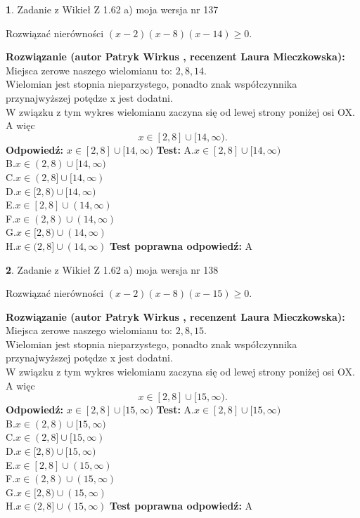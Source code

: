 \documentclass[12pt, a4paper]{article}
\theoremstyle{definition} %
\newtheorem{zad}{}
\newcommand{\zadStart}[1]{\begin{zad}#1\newline}
\newcommand{\zadStop}{\end{zad}}
\newcommand{\rozwStart}[2]{\noindent \textbf{Rozwiązanie (autor #1 , recenzent #2): }\newline}
\newcommand{\rozwStop}{\newline}
\newcommand{\odpStart}{\noindent \textbf{Odpowiedź:}\newline}
\newcommand{\odpStop}{\newline}
\newcommand{\testStart}{\noindent \textbf{Test:}\newline}
\newcommand{\testStop}{\newline}
\newcommand{\kluczStart}{\noindent \textbf{Test poprawna odpowiedź:}\newline}
\newcommand{\kluczStop}{\newline}
\begin{document}
\zadStart{Zadanie z Wikieł Z 1.62 a) moja wersja nr 137}

Rozwiązać nierówności $(x-2)(x-8)(x-14)\ge0$.
\zadStop
\rozwStart{Patryk Wirkus}{Laura Mieczkowska}
Miejsca zerowe naszego wielomianu to: $2, 8, 14$.\\
Wielomian jest stopnia nieparzystego, ponadto znak współczynnika przy\linebreak najwyższej potędze x jest dodatni.\\ W związku z tym wykres wielomianu zaczyna się od lewej strony poniżej osi OX. A więc $$x \in [2,8] \cup [14,\infty).$$
\rozwStop
\odpStart
$x \in [2,8] \cup [14,\infty)$
\odpStop
\testStart
A.$x \in [2,8] \cup [14,\infty)$\\
B.$x \in (2,8) \cup [14,\infty)$\\
C.$x \in (2,8] \cup [14,\infty)$\\
D.$x \in [2,8) \cup [14,\infty)$\\
E.$x \in [2,8] \cup (14,\infty)$\\
F.$x \in (2,8) \cup (14,\infty)$\\
G.$x \in [2,8) \cup (14,\infty)$\\
H.$x \in (2,8] \cup (14,\infty)$
\testStop
\kluczStart
A
\kluczStop



\zadStart{Zadanie z Wikieł Z 1.62 a) moja wersja nr 138}

Rozwiązać nierówności $(x-2)(x-8)(x-15)\ge0$.
\zadStop
\rozwStart{Patryk Wirkus}{Laura Mieczkowska}
Miejsca zerowe naszego wielomianu to: $2, 8, 15$.\\
Wielomian jest stopnia nieparzystego, ponadto znak współczynnika przy\linebreak najwyższej potędze x jest dodatni.\\ W związku z tym wykres wielomianu zaczyna się od lewej strony poniżej osi OX. A więc $$x \in [2,8] \cup [15,\infty).$$
\rozwStop
\odpStart
$x \in [2,8] \cup [15,\infty)$
\odpStop
\testStart
A.$x \in [2,8] \cup [15,\infty)$\\
B.$x \in (2,8) \cup [15,\infty)$\\
C.$x \in (2,8] \cup [15,\infty)$\\
D.$x \in [2,8) \cup [15,\infty)$\\
E.$x \in [2,8] \cup (15,\infty)$\\
F.$x \in (2,8) \cup (15,\infty)$\\
G.$x \in [2,8) \cup (15,\infty)$\\
H.$x \in (2,8] \cup (15,\infty)$
\testStop
\kluczStart
A
\kluczStop
\end{document}
